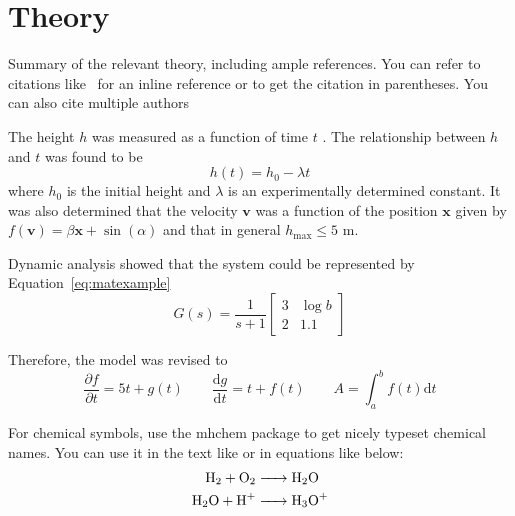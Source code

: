 \section{Theory}
Summary of the relevant theory, including ample references. You can refer to citations like~\textcite{bruckmanmandersloot} for an inline reference or \parencite{bruckmanmandersloot} to get the citation in parentheses. You can also cite multiple authors~\parencite{mandersloot,bruckmanmandersloot}

The height $h$  was measured as a function of time $t$ .  The relationship between $h$ and $t$ was found to be 
\begin{equation}
  \label{eq:commaexample}
  h(t) = h_0 - \lambda t
\end{equation}
where $h_0$ is the initial height and $\lambda$ is an experimentally
determined constant.  It was also determined that the velocity
$\mathbf{v}$ was a function of the position $\mathbf{x}$ given by
$f(\mathbf{v}) = \beta \mathbf{x} + \sin(\alpha)$ and that in general
$h_{\mathrm{max}} \leq 5$ m.

Dynamic analysis showed that the system could be represented by
Equation~\ref{eq:matexample}
\begin{equation}
  \label{eq:matexample}
  G(s) = \frac{1}{s+1}\left [ 
    \begin{array}{cc} 
      3 & \log{b} \\ 
      2 & \num{1.1} 
    \end{array} \right ]
\end{equation}

Therefore, the model was revised to
\begin{equation}
  \frac{\partial f}{\partial t} = 5t + g(t) \qquad \frac{\mathrm{d} g}{\mathrm{d} t} = t + f(t) \qquad A = \int_a^b f(t) \mathrm{d} t
\end{equation}

For chemical symbols, use the mhchem package to get nicely typeset chemical
names. You can use it in the text like  or in equations like below:
\begin{align}
  \label{eq:chemexample}
  \ce{H2 + O2 &-> H2O} \\
  \ce{H2O + H+ &-> H3O+}
\end{align}

